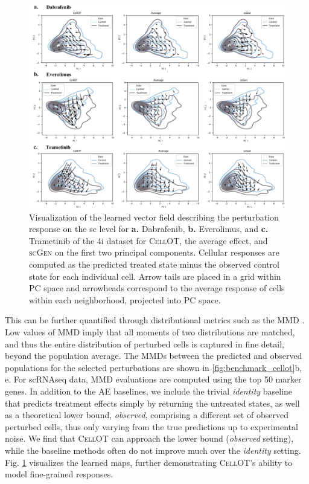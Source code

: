  \begin{figure}[t]
     \centering
     \includegraphics[width=\textwidth]{figures/fig_4i_vector_fields.pdf}
     \caption{Visualization of the learned vector field describing the perturbation response on the \acrlong{sc} level for \textbf{a.} Dabrafenib, \textbf{b.} Everolimus, and \textbf{c.} Trametinib of the \acrshort{4i} dataset for \textsc{CellOT}, the average effect, and \textsc{scGen} on the first two principal components. Cellular responses are computed as the predicted treated state minus the observed control state for each individual cell. Arrow tails are placed in a grid within PC space and arrowheads correspond to the average response of cells within each neighborhood, projected into PC space.}
     \label{fig:4i_vector_fields}
 \end{figure}

 This can be further quantified %
through distributional metrics such as the \acrfull{MMD} \citep{gretton2012kernel}.
Low values of \acrshort{MMD} imply that all moments of two distributions are matched, and thus the entire distribution of perturbed cells is captured in fine detail, beyond the population average.
The \acrshort{MMD}s between the predicted and observed populations for the selected perturbations are shown in \cref{fig:benchmark_cellot}b, e.
For \acrshort{sc}\acrshort{RNAseq} data, \acrshort{MMD} evaluations are computed using the top 50 marker genes.
In addition to the \acrlong{AE} baselines, we include the trivial \emph{identity} baseline that predicts treatment effects simply by returning the untreated states,
as well as a theoretical lower bound, \emph{observed}, comprising a different set of observed perturbed cells, thus only varying from the true predictions up to experimental noise.
We find that \textsc{CellOT} can approach the lower bound (\emph{observed} setting), while the baseline methods often do not improve much over the \emph{identity} setting.
Fig. \ref{fig:4i_vector_fields} visualizes the learned maps, %
further demonstrating \textsc{CellOT}'s ability to model fine-grained responses.


